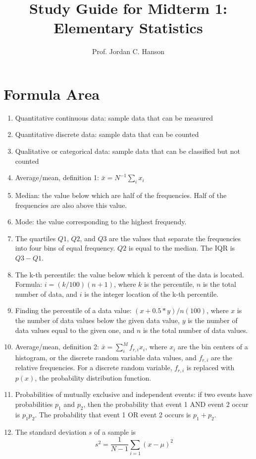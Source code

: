 \documentclass{article}
\begin{document}
\title{Study Guide for Midterm 1: Elementary Statistics}
\author{Prof. Jordan C. Hanson}

\maketitle

\section{Formula Area}

\begin{enumerate}
\item Quantitative continuous data: sample data that can be measured
\item Quantitative discrete data: sample data that can be counted
\item Qualitative or categorical data: sample data that can be classified but not counted
\item Average/mean, definition 1: $\bar{x} = N^{-1} \sum_i x_i$
\item Median: the value below which are half of the frequencies.  Half of the frequencies are also above this value.
\item Mode: the value corresponding to the highest frequendy.
\item The quartiles $Q1$, $Q2$, and $Q3$ are the values that separate the frequencies into four bins of equal frequency. $Q2$ is equal to the median.  The IQR is $Q3 - Q1$.
\item The k-th percentile: the value below which k percent of the data is located.  Formula: $i = (k/100) (n+1)$, where $k$ is the percentile, $n$ is the total number of data, and $i$ is the integer location of the k-th percentile.
\item Finding the percentile of a data value: $(x+0.5*y)/n (100)$, where $x$ is the number of data values below the given data value, $y$ is the number of data values equal to the given one, and $n$ is the total number of data values.
\item Average/mean, definition 2: $\bar{x} = \sum_i^{M} f_{r,i} x_i$, where $x_i$ are the bin centers of a histogram, or the discrete random variable data values, and $f_{r,i}$ are the relative frequencies.  For a discrete random variable, $f_{r,i}$ is replaced with $p(x)$, the probability distribution function.
\item Probabilities of mutually exclusive and independent events: if two events have probabilities $p_1$ and $p_2$, then the probability that event 1 AND event 2 occur is $p_1 p_2$.  The probability that event 1 OR event 2 occurs is $p_1 + p_2$.
\item The standard deviation $s$ of a sample is 
\begin{equation}
s^2 = \frac{1}{N-1}\sum_{i=1} (x-\mu)^2
\end{equation}
\end{enumerate}
\end{document}

